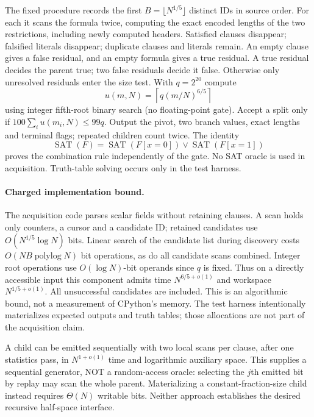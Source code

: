 \documentclass[11pt]{article}
\begin{document}
The fixed procedure records the first $B=\lfloor N^{1/5}\rfloor$ distinct IDs
in source order. For each it scans the formula twice, computing the exact
encoded lengths of the two restrictions, including newly computed headers.
Satisfied clauses disappear; falsified literals disappear; duplicate clauses
and literals remain. An empty clause gives a false residual, and an empty
formula gives a true residual. A true residual decides the parent true; two
false residuals decide it false. Otherwise only unresolved residuals enter the
size test. With $q=2^{20}$ compute
\[
 u(m,N)=\left\lceil q(m/N)^{6/5}\right\rceil
\]
using integer fifth-root binary search (no floating-point gate). Accept a split
only if $100\sum_i u(m_i,N)\le99q$. Output the pivot, two branch values,
exact lengths and terminal flags; repeated children count twice. The identity
\[
 \operatorname{SAT}(F)=\operatorname{SAT}(F[x=0])\vee
 \operatorname{SAT}(F[x=1])
\]
proves the combination rule independently of the gate. No SAT oracle is used
in acquisition. Truth-table solving occurs only in the test harness.

\paragraph{Charged implementation bound.}
The acquisition code parses scalar fields without retaining clauses. A scan
holds only counters, a cursor and a candidate ID; retained candidates use
$O(N^{1/5}\log N)$ bits. Linear search of the candidate list during discovery
costs $O(NB\operatorname{polylog}N)$ bit operations, as do all candidate scans
combined. Integer root operations use $O(\log N)$-bit operands since $q$ is
fixed. Thus on a directly accessible input this component admits time
$N^{6/5+o(1)}$ and workspace $N^{1/5+o(1)}$. All unsuccessful candidates are
included. This is an algorithmic bound, not a measurement of CPython's memory.
The test harness intentionally materializes expected outputs and truth tables;
those allocations are not part of the acquisition claim.

A child can be emitted sequentially with two local scans per clause, after
one statistics pass, in $N^{1+o(1)}$ time and logarithmic auxiliary space.
This supplies a sequential generator, NOT a random-access oracle: selecting
the $j$th emitted bit by replay may scan the whole parent. Materializing a
constant-fraction-size child instead requires $\Theta(N)$ writable bits.
Neither approach establishes the desired recursive half-space interface.
\end{document}
